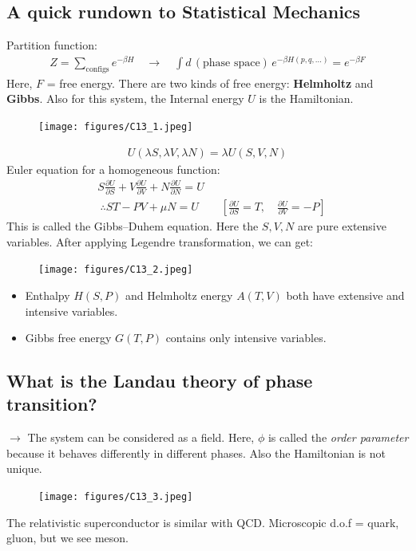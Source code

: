\documentclass[14pt]{article} %
\begin{document}
\begin{tcolorbox}
\subsection*{A quick rundown to Statistical Mechanics}
Partition function:
\begin{align*}
Z = \sum_{\text{configs}} e^{-\beta H} \quad \longrightarrow \quad \int d \, (\text{phase space}) \, e^{-\beta H(p, q, \dots)} = e^{-\beta F}
\end{align*}
Here, $F$ = free energy. There are two kinds of free energy: \textbf{Helmholtz} and \textbf{Gibbs}. Also for this system, the Internal energy $U$ is the Hamiltonian.
\begin{figure}[H]
    \centering
    \texttt{[image: figures/C13\_1.jpeg]}
    \caption*{}
\end{figure}
\vspace{-2.3cm}
\begin{align*}
U(\lambda S, \lambda V, \lambda N) = \lambda U(S, V, N)
\end{align*}
Euler equation for a homogeneous function:
\begin{align*}
&S \frac{\partial U}{\partial S} + V \frac{\partial U}{\partial V} + N \frac{\partial U}{\partial N} = U \\
& ~ \therefore ST - PV + \mu N = U \qquad \left[ \frac{\partial U}{\partial S} = T, \quad \frac{\partial U}{\partial V} = -P \right]
\end{align*}
This is called the Gibbs–Duhem equation. Here the $ S,V,N $ are pure extensive variables. After applying Legendre transformation, we can get:
\begin{figure}[H]
    \centering
    \texttt{[image: figures/C13\_2.jpeg]}
    \caption*{}
\end{figure}
\vspace{-1.5cm}
\begin{itemize}
\item Enthalpy $H(S,P)$ and Helmholtz energy $A(T,V)$ both have extensive and intensive variables.
\item Gibbs free energy $G(T,P)$ contains only intensive variables.
\end{itemize}
\end{tcolorbox}
\begin{tcolorbox}
\subsection*{What is the Landau theory of phase transition?}
$\rightarrow$ The system can be considered as a field. Here, $\phi$ is called the \textit{order parameter} because it behaves differently in different phases. Also the Hamiltonian is not unique.
\vspace{-1cm}
\begin{figure}[H]
    \centering
    \texttt{[image: figures/C13\_3.jpeg]}
    \caption*{}
\end{figure}
\vspace{-1.3cm}
The relativistic superconductor is similar with QCD. Microscopic d.o.f = quark, gluon, but we see meson.
\end{tcolorbox}
\end{document}
